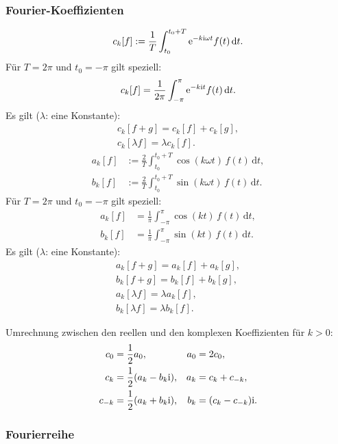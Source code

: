 \subsubsection{Fourier-Koeffizienten}
\begin{equation}
c_k[f] := \frac{1}{T}\int_{t_0}^{t_0+T} \mathrm e^{-k\mathrm i\omega t}f(t)\,\mathrm dt.
\end{equation}
Für $T=2\pi$ und $t_0=-\pi$ gilt speziell:
\begin{equation}
c_k[f] = \frac{1}{2\pi}\int_{-\pi}^{\pi} \mathrm e^{-k\mathrm i t}f(t)\,\mathrm dt.
\end{equation}
Es gilt ($\lambda$: eine Konstante):
\begin{gather}
c_k[f+g] = c_k[f]+c_k[g],\\
c_k[\lambda f] = \lambda c_k[f].
\end{gather}
\begin{align}
a_k[f] &:= \frac{2}{T}\int_{t_0}^{t_0+T} \cos(k\omega t)\,f(t)\,\mathrm dt,\\
b_k[f] &:= \frac{2}{T}\int_{t_0}^{t_0+T} \sin(k\omega t)\,f(t)\,\mathrm dt.
\end{align}
Für $T=2\pi$ und $t_0=-\pi$ gilt speziell:
\begin{align}
a_k[f] &= \frac{1}{\pi}\int_{-\pi}^{\pi} \cos(kt)\,f(t)\,\mathrm dt,\\
b_k[f] &= \frac{1}{\pi}\int_{-\pi}^{\pi} \sin(kt)\,f(t)\,\mathrm dt.
\end{align}
Es gilt ($\lambda$: eine Konstante):
\begin{gather}
a_k[f+g] = a_k[f]+a_k[g],\\
b_k[f+g] = b_k[f]+b_k[g],\\
a_k[\lambda f] = \lambda a_k[f],\\
b_k[\lambda f] = \lambda b_k[f].
\end{gather}

\newpage\noindent
Umrechnung zwischen den reellen und den komplexen
Koeffizienten für $k>0$:
\begin{align}
c_0 &= \frac{1}{2}a_0, & a_0&=2c_0,\\
c_k &= \frac{1}{2}(a_k-b_k\mathrm i), & a_k &= c_k+c_{-k},\\
c_{-k} &= \frac{1}{2}(a_k+b_k\mathrm i), & b_k &= (c_k-c_{-k})\mathrm i.
\end{align}

\subsubsection{Fourierreihe}

